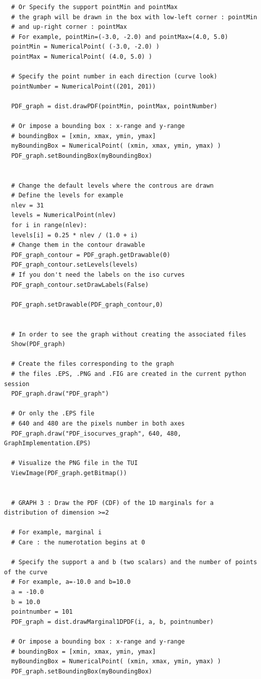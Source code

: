 \begin{lstlisting}
  # Or Specify the support pointMin and pointMax
  # the graph will be drawn in the box with low-left corner : pointMin
  # and up-right corner : pointMax
  # For example, pointMin=(-3.0, -2.0) and pointMax=(4.0, 5.0)
  pointMin = NumericalPoint( (-3.0, -2.0) )
  pointMax = NumericalPoint( (4.0, 5.0) )

  # Specify the point number in each direction (curve look)
  pointNumber = NumericalPoint((201, 201))

  PDF_graph = dist.drawPDF(pointMin, pointMax, pointNumber)

  # Or impose a bounding box : x-range and y-range
  # boundingBox = [xmin, xmax, ymin, ymax]
  myBoundingBox = NumericalPoint( (xmin, xmax, ymin, ymax) )
  PDF_graph.setBoundingBox(myBoundingBox)


  # Change the default levels where the controus are drawn
  # Define the levels for example
  nlev = 31
  levels = NumericalPoint(nlev)
  for i in range(nlev):
  levels[i] = 0.25 * nlev / (1.0 + i)
  # Change them in the contour drawable
  PDF_graph_contour = PDF_graph.getDrawable(0)
  PDF_graph_contour.setLevels(levels)
  # If you don't need the labels on the iso curves
  PDF_graph_contour.setDrawLabels(False)

  PDF_graph.setDrawable(PDF_graph_contour,0)


  # In order to see the graph without creating the associated files
  Show(PDF_graph)

  # Create the files corresponding to the graph
  # the files .EPS, .PNG and .FIG are created in the current python session
  PDF_graph.draw("PDF_graph")

  # Or only the .EPS file
  # 640 and 480 are the pixels number in both axes
  PDF_graph.draw("PDF_isocurves_graph", 640, 480, GraphImplementation.EPS)

  # Visualize the PNG file in the TUI
  ViewImage(PDF_graph.getBitmap())


  # GRAPH 3 : Draw the PDF (CDF) of the 1D marginals for a distribution of dimension >=2

  # For example, marginal i
  # Care : the numerotation begins at 0

  # Specify the support a and b (two scalars) and the number of points of the curve
  # For example, a=-10.0 and b=10.0
  a = -10.0
  b = 10.0
  pointnumber = 101
  PDF_graph = dist.drawMarginal1DPDF(i, a, b, pointnumber)

  # Or impose a bounding box : x-range and y-range
  # boundingBox = [xmin, xmax, ymin, ymax]
  myBoundingBox = NumericalPoint( (xmin, xmax, ymin, ymax) )
  PDF_graph.setBoundingBox(myBoundingBox)


\end{lstlisting}
